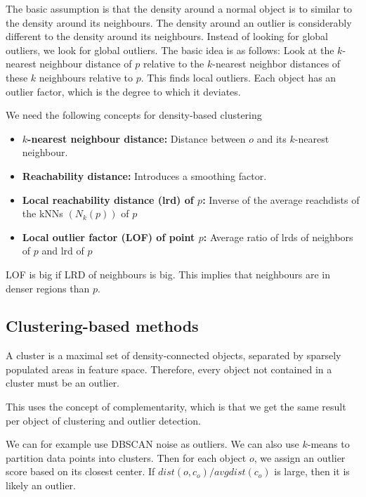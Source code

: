     The basic assumption is that the density around a normal object is to similar to the density around its neighbours. The density around an outlier is considerably different to the density around its neighbours. 
    Instead of looking for global outliers, we look for global outliers. The basic idea is as follows: Look at the $k$-nearest neighbour distance of $p$ relative to the $k$-nearest neighbor distances of these $k$ neighbours relative to $p$. This finds local outliers. Each object has an outlier factor, which is the degree to which it deviates. 
    
    We need the following concepts for density-based clustering
    
    \begin{itemize}
        \item \textbf{$k$-nearest neighbour distance:} Distance between $o$ and its $k$-nearest neighbour. 
        \item \textbf{Reachability distance:} Introduces a smoothing factor. 
        \item \textbf{Local reachability distance (lrd) of $p$:} Inverse of the average reachdists of the kNNs $(N_k(p))$ of $p$ 
        \item \textbf{Local outlier factor (LOF) of point $p$:} Average ratio of lrds of neighbors of $p$ and lrd of $p$ 
    \end{itemize}
    LOF is big if LRD of neighbours is big. This implies that neighbours are in denser regions than $p$. 
    
\subsection{Clustering-based methods}
    A cluster is a maximal set of density-connected objects, separated by sparsely populated areas in feature space. Therefore, every object not contained in a cluster must be an outlier. 
    
    This uses the concept of complementarity, which is that we get the same result per object of clustering and outlier detection.

    We can for example use DBSCAN noise as outliers. We can also use $k$-means to partition data points into clusters. Then for each object $o$, we assign an outlier score based on its closest center. If $dist(o, c_o)/avgdist(c_o)$ is large, then it is likely an outlier. 
    
